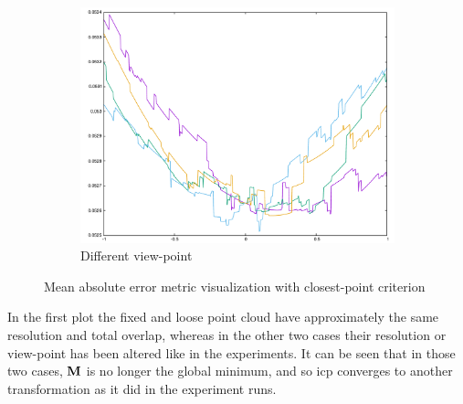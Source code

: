 \begin{figure}[H]
\begin{subfigure}{.33\textwidth}
	\includegraphics[width=\linewidth]{fig/relief_dproj_err.pdf}
	\caption{Different view-point}
\end{subfigure}
\caption{Mean absolute error metric visualization with closest-point criterion}
\label{fig:relief_err}
\end{figure}

In the first plot the fixed and loose point cloud have approximately the same resolution and total overlap, whereas in the other two cases their resolution or view-point has been altered like in the experiments. It can be seen that in those two cases, $\mathbf{M}$ is no longer the global minimum, and so \gls{icp} converges to another transformation as it did in the experiment runs.


\FloatBarrier

\newpage


